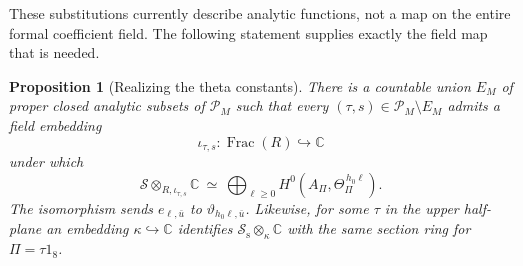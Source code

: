 \documentclass[11pt]{article}
\newtheorem{proposition}[theorem]{Proposition}
\theoremstyle{definition}
\theoremstyle{remark}
\numberwithin{equation}{section}
\begin{document}
These substitutions currently describe analytic functions, not a map
on the entire formal coefficient field.  The following statement supplies
exactly the field map that is needed.

\begin{proposition}[Realizing the theta constants]\label{theta:realization}
There is a countable union $E_M$ of proper closed analytic subsets of
$\mathcal P_M$ such that every $(\tau,s)\in\mathcal P_M\setminus E_M$
admits a field embedding
\[
 \iota_{\tau,s}:\operatorname{Frac}(R)\hookrightarrow\mathbb C
\]
under which
\begin{equation}\label{theta:generic-section-ring}
 \mathscr S\otimes_{R,\iota_{\tau,s}}\mathbb C
 \ \simeq\
 \bigoplus_{\ell\geq0}
       H^0(A_\Pi,\Theta_\Pi^{\,h_0\ell}).
\end{equation}
The isomorphism sends $e_{\ell,\bar u}$ to
$\vartheta_{h_0\ell,\bar u}$.  Likewise, for some
$\tau$ in the upper half-plane an embedding $\kappa\hookrightarrow\mathbb C$
identifies $\mathscr S_{\mathrm s}\otimes_\kappa\mathbb C$ with the same section
ring for $\Pi=\tau1_8$.
\end{proposition}
\end{document}
